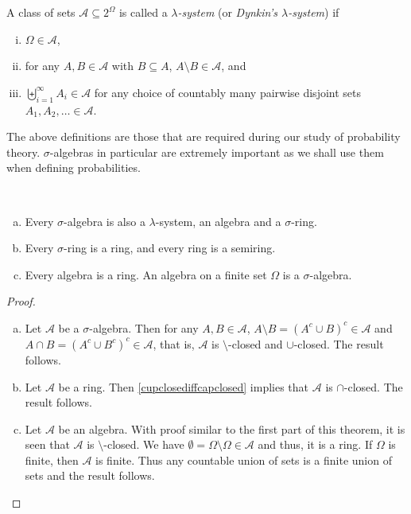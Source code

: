 \begin{definition}
\label{defLamSystem}
    A class of sets $\mathcal{A}\subseteq2^\Omega$ is called a \textit{$\lambda$-system} (or \textit{Dynkin's $\lambda$-system}) if
    \begin{enumerate}[(i)]
        \item $\Omega\in\mathcal{A}$,
        \item for any $A,B\in\mathcal{A}$ with $B\subseteq A$, $A\setminus B\in\mathcal{A}$, and
        \item $\displaystyle\biguplus_{i=1}^\infty A_i\in\mathcal{A}$ for any choice of countably many pairwise disjoint sets $A_1,A_2,\ldots\in\mathcal{A}$.
    \end{enumerate}
\end{definition}

The above definitions are those that are required during our study of probability theory. $\sigma$-algebras in particular are extremely important as we shall use them when defining probabilities.

\begin{theorem}
~
    \begin{enumerate}[(a)]
        \item Every $\sigma$-algebra is also a $\lambda$-system, an algebra and a $\sigma$-ring.
        \item Every $\sigma$-ring is a ring, and every ring is a semiring.
        \item Every algebra is a ring. An algebra on a finite set $\Omega$ is a $\sigma$-algebra.
    \end{enumerate}
\end{theorem}
\begin{proof}
~
    \begin{enumerate}[(a)]
        \item Let $\mathcal{A}$ be a $\sigma$-algebra. Then for any $A,B\in\mathcal{A}$, $A\setminus B = (A^c\cup B)^c \in \mathcal{A}$ and $A\cap B=(A^c\cup B^c)^c\in\mathcal{A}$, that is, $\mathcal{A}$ is $\setminus$-closed and $\cup$-closed. The result follows.
        
        \item Let $\mathcal{A}$ be a ring. Then \ref{cupclosediffcapclosed} implies that $\mathcal{A}$ is $\cap$-closed. The result follows.
        
        \item Let $\mathcal{A}$ be an algebra. With proof similar to the first part of this theorem, it is seen that $\mathcal{A}$ is $\setminus$-closed. We have $\emptyset=\Omega\setminus\Omega\in\mathcal{A}$ and thus, it is a ring. If $\Omega$ is finite, then $\mathcal{A}$ is finite. Thus any countable union of sets is a finite union of sets and the result follows.
        \end{enumerate}
\end{proof}

